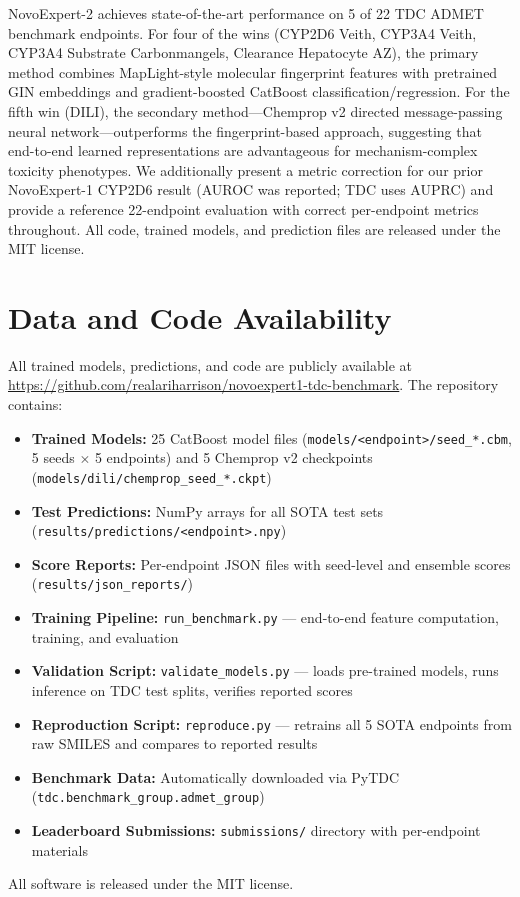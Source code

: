 \documentclass[11pt]{article}
\begin{document}
NovoExpert-2 achieves state-of-the-art performance on 5 of 22 TDC ADMET benchmark endpoints. For four of the wins (CYP2D6 Veith, CYP3A4 Veith, CYP3A4 Substrate Carbonmangels, Clearance Hepatocyte AZ), the primary method combines MapLight-style molecular fingerprint features with pretrained GIN embeddings and gradient-boosted CatBoost classification/regression. For the fifth win (DILI), the secondary method---Chemprop v2 directed message-passing neural network---outperforms the fingerprint-based approach, suggesting that end-to-end learned representations are advantageous for mechanism-complex toxicity phenotypes. We additionally present a metric correction for our prior NovoExpert-1 CYP2D6 result (AUROC was reported; TDC uses AUPRC) and provide a reference 22-endpoint evaluation with correct per-endpoint metrics throughout. All code, trained models, and prediction files are released under the MIT license.

\section*{Data and Code Availability}

All trained models, predictions, and code are publicly available at \url{https://github.com/realariharrison/novoexpert1-tdc-benchmark}. The repository contains:
\begin{itemize}
    \item \textbf{Trained Models:} 25 CatBoost model files (\texttt{models/<endpoint>/seed\_*.cbm}, 5 seeds $\times$ 5 endpoints) and 5 Chemprop v2 checkpoints (\texttt{models/dili/chemprop\_seed\_*.ckpt})
    \item \textbf{Test Predictions:} NumPy arrays for all SOTA test sets (\texttt{results/predictions/<endpoint>.npy})
    \item \textbf{Score Reports:} Per-endpoint JSON files with seed-level and ensemble scores (\texttt{results/json\_reports/})
    \item \textbf{Training Pipeline:} \texttt{run\_benchmark.py} --- end-to-end feature computation, training, and evaluation
    \item \textbf{Validation Script:} \texttt{validate\_models.py} --- loads pre-trained models, runs inference on TDC test splits, verifies reported scores
    \item \textbf{Reproduction Script:} \texttt{reproduce.py} --- retrains all 5 SOTA endpoints from raw SMILES and compares to reported results
    \item \textbf{Benchmark Data:} Automatically downloaded via PyTDC (\texttt{tdc.benchmark\_group.admet\_group})
    \item \textbf{Leaderboard Submissions:} \texttt{submissions/} directory with per-endpoint materials
\end{itemize}
All software is released under the MIT license.
\end{document}
